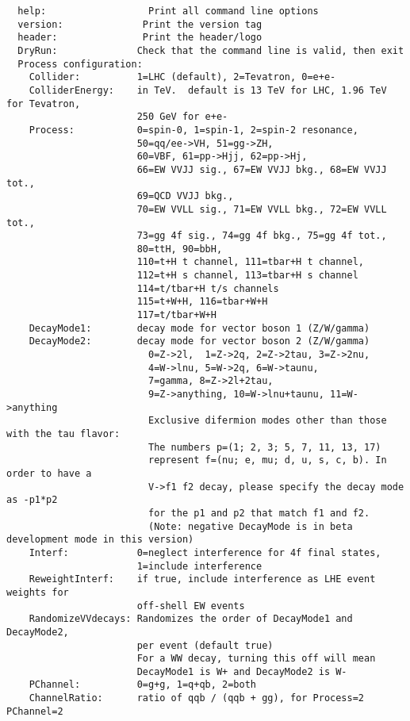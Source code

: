 \documentclass[aps,superscriptaddress,nofootinbib]{revtex4}
\begin{document}
\begin{verbatim}
  help:                  Print all command line options
  version:              Print the version tag
  header:               Print the header/logo
  DryRun:              Check that the command line is valid, then exit
  Process configuration:
    Collider:          1=LHC (default), 2=Tevatron, 0=e+e-
    ColliderEnergy:    in TeV.  default is 13 TeV for LHC, 1.96 TeV for Tevatron,
                       250 GeV for e+e-
    Process:           0=spin-0, 1=spin-1, 2=spin-2 resonance,
                       50=qq/ee->VH, 51=gg->ZH,
                       60=VBF, 61=pp->Hjj, 62=pp->Hj,
                       66=EW VVJJ sig., 67=EW VVJJ bkg., 68=EW VVJJ tot.,
                       69=QCD VVJJ bkg.,
                       70=EW VVLL sig., 71=EW VVLL bkg., 72=EW VVLL tot.,
                       73=gg 4f sig., 74=gg 4f bkg., 75=gg 4f tot.,
                       80=ttH, 90=bbH,
                       110=t+H t channel, 111=tbar+H t channel,
                       112=t+H s channel, 113=tbar+H s channel
                       114=t/tbar+H t/s channels
                       115=t+W+H, 116=tbar+W+H
                       117=t/tbar+W+H
    DecayMode1:        decay mode for vector boson 1 (Z/W/gamma)
    DecayMode2:        decay mode for vector boson 2 (Z/W/gamma)
                         0=Z->2l,  1=Z->2q, 2=Z->2tau, 3=Z->2nu,
                         4=W->lnu, 5=W->2q, 6=W->taunu,
                         7=gamma, 8=Z->2l+2tau,
                         9=Z->anything, 10=W->lnu+taunu, 11=W->anything
                         Exclusive difermion modes other than those with the tau flavor:
                         The numbers p=(1; 2, 3; 5, 7, 11, 13, 17)
                         represent f=(nu; e, mu; d, u, s, c, b). In order to have a
                         V->f1 f2 decay, please specify the decay mode as -p1*p2
                         for the p1 and p2 that match f1 and f2.
                         (Note: negative DecayMode is in beta development mode in this version)
    Interf:            0=neglect interference for 4f final states,
                       1=include interference
    ReweightInterf:    if true, include interference as LHE event weights for
                       off-shell EW events
    RandomizeVVdecays: Randomizes the order of DecayMode1 and DecayMode2,
                       per event (default true)
                       For a WW decay, turning this off will mean
                       DecayMode1 is W+ and DecayMode2 is W-
    PChannel:          0=g+g, 1=q+qb, 2=both
    ChannelRatio:      ratio of qqb / (qqb + gg), for Process=2 PChannel=2

\end{verbatim}
\end{document}
